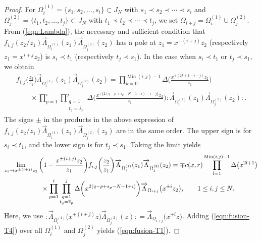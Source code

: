 \documentclass[pdftex]{sigma}
\numberwithin{equation}{section}
\begin{document}
\begin{proof}
For %
$\Omega_i^{(1)}=\{s_1, s_2, \dots, s_i\} \subset J_N$
with $s_1\prec s_2 \prec \cdots \prec s_i$ and
$\Omega_j^{(2)}=\{t_1, t_2, \dots, t_j\}\allowbreak \subset J_N$
with $t_1\prec t_2 \prec \cdots \prec t_j$,
we set $\Omega_{i+j}=\Omega_i^{(1)} \cup \Omega_j^{(2)}$.
From (\ref{eqn:Lambda}), the necessary and sufficient condition that
$f_{i,j}(z_2/z_1)\overrightarrow{\Lambda}_{\Omega_i^{(1)}}(z_1)
\overrightarrow{\Lambda}_{\Omega_j^{(2)}}(z_2)$
has a pole at $z_1=x^{-(i+j)}z_2$ (respectively $z_1=x^{i+j}z_2$)
is $s_i \prec t_1$ (respectively $t_j \prec s_1$).
In the case when $s_i \prec t_1$ or $t_j \prec s_1$, we obtain\vspace{-1ex}
\begin{gather*}
f_{i,j}\bigg(\frac{z_2}{z_1}\bigg)
\overrightarrow{\Lambda}_{\Omega_i^{(1)}}(z_1)
\overrightarrow{\Lambda}_{\Omega_j^{(2)}}(z_2)
=\prod_{k=0}^{\operatorname{Min}(i,j)-1}
\Delta\bigg(\frac{x^{{\pm(2k+1-i-j)}}z_2}{z_1}\bigg)
\\ \qquad
{}\times\prod_{p=1}^i\prod\limits_{\substack{q=1\\t_q=\overline{s}_p}}^j
\Delta\bigg(\frac{x^{{\pm \{2(q-p+s_p-N-1+i)-i-j\}}}z_2}{z_1}\bigg){:}
\overrightarrow{\Lambda}_{\Omega_i^{(1)}}(z_1)
\overrightarrow{\Lambda}_{\Omega_j^{(2)}}(z_2){:}.
\end{gather*}
The signs $\pm$
in the products in the above expression
of ${f_{i,j}(z_2/z_1)\overrightarrow{\Lambda}_{\Omega_i^{(1)}}(z_1)
\overrightarrow{\Lambda}_{\Omega_j^{(2)}}(z_2)}$ are in the same order.
The upper sign is for $s_i \prec t_1$, and the lower sign is for $t_j \prec s_1$.
Taking the limit yields
\begin{gather}
\lim_{z_1 \to x^{\pm (i+j)}z_2}
\bigg(1-\frac{x^{\pm (i+j)}z_2}{z_1}\bigg)f_{i,j}\bigg(\frac{z_2}{z_1}\bigg)
\overrightarrow{\Lambda}_{\Omega_i^{(1)}}(z_1)
\overrightarrow{\Lambda}_{\Omega_j^{(2)}}(z_2)\notag
=\mp c(x,r)\prod_{l=1}^{\operatorname{Min}(i,j)-1}\Delta\big(x^{2l+1}\big)
\\ \qquad
{}\times\prod_{p=1}^i\prod\limits_{\substack{q=1\\t_q=\overline{s}_p}}^j
\Delta\bigg(x^{2(q-p+s_p-N-1+i)}\bigg)
\overrightarrow{\Lambda}_{\Omega_{i+j}}\big(x^{\pm i}z_2\big),\qquad
1\leq i, j \leq N.
\label{eqn:fusion-T4}
\end{gather}
Here, we use ${:}\overrightarrow{\Lambda}_{\Omega_i^{(1)}}\big(x^{\pm (i+j)}z\big)
\overrightarrow{\Lambda}_{\Omega_j^{(2)}}(z){:}=
\overrightarrow{\Lambda}_{\Omega_{i+j}}\big(x^{\pm i}z\big)$.
Adding (\ref{eqn:fusion-T4}) over all $\Omega_i^{(1)}$ and
$\Omega_j^{(2)}$ yields (\ref{eqn:fusion-T1}).
\end{proof}
\end{document}
